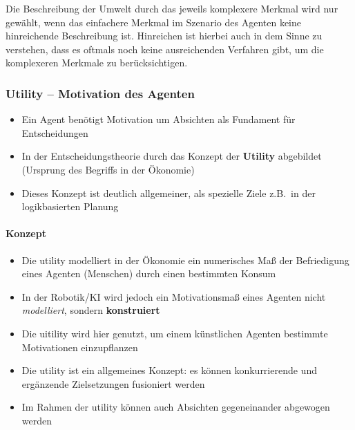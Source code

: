 Die Beschreibung der Umwelt durch das jeweils komplexere Merkmal wird nur gewählt, wenn das einfachere Merkmal im Szenario des Agenten keine hinreichende Beschreibung ist.
Hinreichen ist hierbei auch in dem Sinne zu verstehen, dass es oftmals noch keine ausreichenden Verfahren gibt, um die komplexeren Merkmale zu berücksichtigen.

\subsubsection{Utility -- Motivation des Agenten}
\begin{itemize}
	\item Ein Agent benötigt Motivation um Absichten als Fundament für Entscheidungen
	\item In der Entscheidungstheorie durch das Konzept der \textbf{Utility} abgebildet (Ursprung des Begriffs in der Ökonomie)
	\item Dieses Konzept ist deutlich allgemeiner, als spezielle Ziele z.B.\ in der logikbasierten Planung	
\end{itemize}

\paragraph{Konzept}
\begin{itemize}
	\item Die utility modelliert in der Ökonomie ein numerisches Maß der Befriedigung eines Agenten (Menschen) durch einen bestimmten Konsum
	\item In der Robotik/KI wird jedoch ein Motivationsmaß eines Agenten nicht \emph{modelliert}, sondern \textbf{konstruiert}
	\item Die uitility wird hier genutzt, um einem künstlichen Agenten bestimmte Motivationen einzupflanzen
	\item Die utility ist ein allgemeines Konzept: es können konkurrierende und ergänzende Zielsetzungen fusioniert werden
	\item Im Rahmen der utility können auch Absichten gegeneinander abgewogen werden
\end{itemize}

